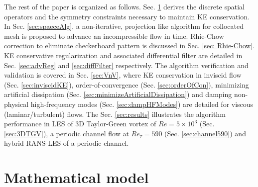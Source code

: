 The rest of the paper is organized as follows. Sec. \ref{sec:mathModel} derives the discrete spatial operators and the symmetry constraints necessary to maintain KE conservation. In Sec. \ref{sec:spaeceAlg}, a non-iterative, projection like algorithm for collocated mesh is proposed to advance an incompressible flow in time.  Rhie-Chow correction to eliminate checkerboard pattern is discussed in Sec. \ref{sec: Rhie-Chow}. KE conservative regularization and associated differential filter are detailed in Sec. \ref{sec:advReg} and \ref{sec:diffFilter} respectively. The algorithm verification and validation is covered in Sec. \ref{sec:VnV}, where KE conservation in inviscid flow (Sec. \ref{sec:inviscidKE}), order-of-convergence (Sec. \ref{sec:orderOfCon}), minimizing artificial dissipation (Sec. \ref{sec:minimizeArtificialDissipation}) and damping non-physical high-frequency modes (Sec. \ref{sec:dampHFModes}) are detailed for viscous (laminar/turbulent) flows. The Sec. \ref{sec:results} illustrates the algorithm performance in LES of 3D Taylor-Green vortex of $Re = 5\times 10^3$ (Sec. \ref{sec:3DTGV}), a periodic channel flow at $Re_\tau = 590$ (Sec. \ref{sec:channel590}) and hybrid RANS-LES of a periodic channel.

%

\section{Mathematical model}
\label{sec:mathModel}


